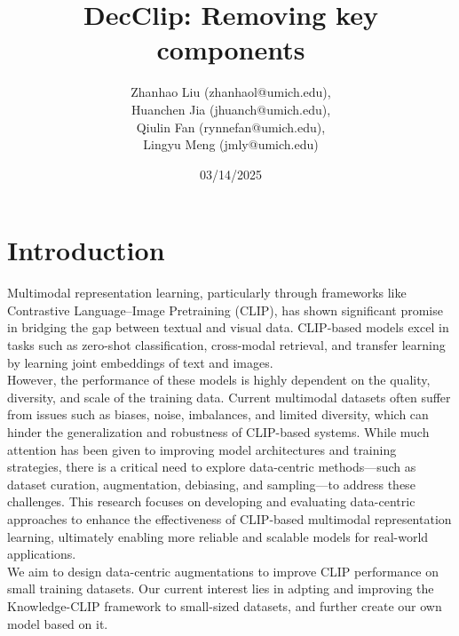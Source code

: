 \documentclass[11pt,letterpaper]{article}
\begin{document}
\title{DecClip: Removing key components }


\author{
Zhanhao Liu (zhanhaol@umich.edu), \\
Huanchen Jia (jhuanch@umich.edu),\\
Qiulin Fan (rynnefan@umich.edu),\\
Lingyu Meng (jmly@umich.edu)\\
}

\date{03/14/2025}


\maketitle


\section{Introduction}
Multimodal representation learning, particularly through frameworks like Contrastive Language–Image Pretraining (CLIP), has shown significant promise in bridging the gap between textual and visual data. CLIP-based models excel in tasks such as zero-shot classification, cross-modal retrieval, and transfer learning by learning joint embeddings of text and images. \\However, the performance of these models is highly dependent on the quality, diversity, and scale of the training data. Current multimodal datasets often suffer from issues such as biases, noise, imbalances, and limited diversity, which can hinder the generalization and robustness of CLIP-based systems. While much attention has been given to improving model architectures and training strategies, there is a critical need to explore data-centric methods—such as dataset curation, augmentation, debiasing, and sampling—to address these challenges. This research focuses on developing and evaluating data-centric approaches to enhance the effectiveness of CLIP-based multimodal representation learning, ultimately enabling more reliable and scalable models for real-world applications.\\
We aim to design data-centric augmentations to improve CLIP performance on small training datasets. Our current interest lies in adpting and improving the Knowledge-CLIP framework\cite{pan2022contrastivelanguageimagepretrainingknowledge} to small-sized datasets, and further create our own model based on it.
\end{document}
